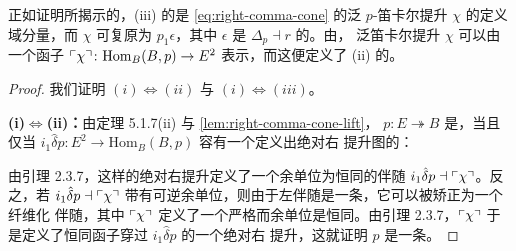 正如证明所揭示的，(iii) 的\trRightAdjoint{}是 \eqref{eq:right-comma-cone} 的泛%
$p$-笛卡尔提升 $\chi$ 的定义域分量，而 $\chi$ 可复原为 $p_{1}\epsilon$，其中
$\epsilon$ 是\trFiberedAdjunction{} $\Delta_{p}\dashv r$ 的\trCounit。由\trOneCellInduction，
泛笛卡尔提升 $\chi$ 可以由一个函子 $\ulcorner\chi\urcorner\colon\mathrm{Hom}_{B}(B,p)\to E^{2}$
表示，而这便定义了 (ii) 的\trRightAdjoint。

\begin{proof}
我们证明 $(i)\Leftrightarrow(ii)$ 与 $(i)\Leftrightarrow(iii)$。

\textbf{(i)$\Leftrightarrow$(ii)：}由定理 5.1.7(ii) 与%
\cref{lem:right-comma-cone-lift}，
$p\colon E\twoheadrightarrow B$ 是\trCartesianFibration，当且仅当
$i_{1}\hat{\delta}p\colon E^{2}\to\mathrm{Hom}_{B}(B,p)$ 容有一个定义出绝对右
提升图的\trSection：
\begin{center}
\end{center}
由引理 2.3.7，这样的绝对右提升定义了一个余单位为恒同的伴随
$i_{1}\hat{\delta}p\dashv\ulcorner\chi\urcorner$。反之，若 $i_{1}\hat{\delta}p\dashv\ulcorner\chi\urcorner$
带有可逆余单位，则由于左伴随是一条\trIsofibration，它可以被矫正为一个纤维化
伴随，其中 $\ulcorner\chi\urcorner$ 定义了一个严格\trSection{}而余单位是恒同。由引理
2.3.7，$\ulcorner\chi\urcorner$ 于是定义了恒同函子穿过 $i_{1}\hat{\delta}p$ 的一个绝对右
提升，这就证明 $p$ 是一条\trCartesianFibration。


\end{proof}

